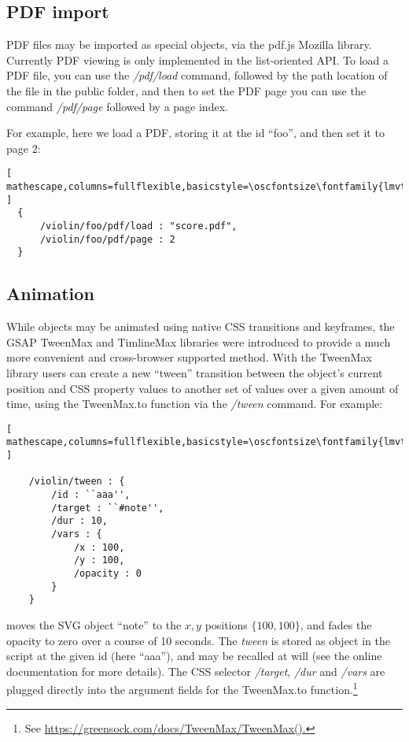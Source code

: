 \subsection{PDF import}\label{sec:pdf}
PDF files may be imported as special \drawsocket objects, via the pdf.js Mozilla library.
Currently PDF viewing is only implemented in the list-oriented API. 
To load a PDF file, you can use the \textit{/pdf/load} command, followed by the path location of the file in the public folder, and then to set the PDF page you can use the command \textit{/pdf/page} followed by a page index.

For example, here we load a PDF, storing it at the \drawsocket id ``foo'', and then set it to page 2:

\begin{lstlisting}[ mathescape,columns=fullflexible,basicstyle=\oscfontsize\fontfamily{lmvtt}\selectfont ]
  {
      /violin/foo/pdf/load : "score.pdf",
      /violin/foo/pdf/page : 2
  }
 \end{lstlisting}


\subsection{Animation}\label{sec:animation}
While \drawsocket objects may be animated using native CSS transitions and keyframes, the GSAP TweenMax and TimlineMax libraries were introduced to provide a much more convenient and cross-browser supported method.
With the TweenMax library users can create a new ``tween'' transition between the object's current position and CSS property values to another set of values over a given amount of time, using the TweenMax.to function via the \textit{/tween} \drawsocket command. For example:
\begin{lstlisting}[ mathescape,columns=fullflexible,basicstyle=\oscfontsize\fontfamily{lmvtt}\selectfont ]

    /violin/tween : {
        /id : ``aaa'',
        /target : ``#note'', 
        /dur : 10,
        /vars : {
            /x : 100,
            /y : 100,
            /opacity : 0
        }
    }
 \end{lstlisting}
\noindent
moves the SVG object ``note'' to the ${x,y}$ positions $\{100,100\}$, and fades the opacity to zero over a course of 10 seconds.
The \textit{tween} is stored as object in the \drawsocket script at the given id (here ``aaa''), and may be recalled at will (see the online documentation for more details).
The CSS selector \textit{/target}, \textit{/dur} and \textit{/vars} are plugged directly into the argument fields for the TweenMax.to function.\footnote{See \url{https://greensock.com/docs/TweenMax/TweenMax().}}


